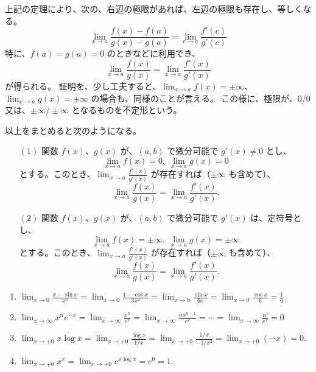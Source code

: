 \note
上記の定理により、次の、右辺の極限があれば、左辺の極限も存在し、等しくなる。
$$\lim_{x\rightarrow a}\frac{f(x) - f(a)}{g(x) - g(a)} = 
\lim_{c\rightarrow a}\frac{f'(c)}{g'(c)}$$
特に、$f(a) = g(a) = 0$ のときなどに利用でき、
$$\lim_{x\rightarrow a}\frac{f(x)}{g(x)} = 
\lim_{x\rightarrow a}\frac{f'(x)}{g'(x)}$$
が得られる。
証明を、少し工夫すると、$\lim_{x\rightarrow a} f(x) = \pm\infty$、
$\lim_{x\rightarrow a} g(x) = \pm\infty$ の場合も、同様のことが言える。
この様に、極限が、$0/0$ 又は、$\pm\infty/\pm\infty$ となるものを{\gt 不定形}という。

\smallskip
以上をまとめると次のようになる。

\begin{thm} 
\begin{itemize}
\item[$(1)$] 関数 $f(x)$、$g(x)$ が、$(a,b)$ で微分可能で $g'(x) \neq 0$ とし、
$$\lim_{x\to a}f(x) = 0,\;\lim_{x\to a}g(x) = 0$$
とする。このとき、$\lim_{x\to a}\frac{f'(x)}{g'(x)}$ が存在すれば（$\pm\infty$ も含めて）、
$$\lim_{x\to a}\frac{f(x)}{g(x)} = \lim_{x\to a}\frac{f'(x)}{g'(x)}.$$
\item[$(2)$] 関数 $f(x)$、$g(x)$ が、$(a,b)$ で微分可能で $g'(x)$ は、定符号とし、
$$\lim_{x\to a}f(x) = \pm\infty,\;\lim_{x\to a}g(x) = \pm\infty$$
とする。このとき、$\lim_{x\to a}\frac{f'(x)}{g'(x)}$ が存在すれば（$\pm\infty$ も含めて）、
$$\lim_{x\to a}\frac{f(x)}{g(x)} = \lim_{x\to a}\frac{f'(x)}{g'(x)}.$$
\end{itemize}
\end{thm}

\begin{eg}
\begin{enumerate}
\item ${\displaystyle \lim_{x\rightarrow 0}\frac{x - \sin x}{x^3} = 
\lim_{x\rightarrow 0}\frac{1-\cos x}{3x^2} = 
\lim_{x\rightarrow 0}\frac{\sin x}{6x} = 
\lim_{x\rightarrow 0}\frac{\cos x}{6} = \frac16}$
\item ${\displaystyle \lim_{x\to\infty}x^ne^{-x} = \lim_{x\to \infty}\frac{x^n}{e^{x}} = \lim_{x\to\infty}\frac{nx^{n-1}}{e^x} = \cdots = \lim_{x\to\infty}\frac{n!}{e^x} = 0}$
\item ${\displaystyle \lim_{x\to +0}x\log x = \lim_{x\to +0}\frac{\log x}{1/x} = \lim_{x\to +0}\frac{1/x}{-1/x^2} = \lim_{x\to +0}(-x) = 0}$.
\item ${\displaystyle \lim_{x\to +0}x^x = \lim_{x\to +0}e^{x\log x} = e^0 = 1}$.
\end{enumerate}
\end{eg}

